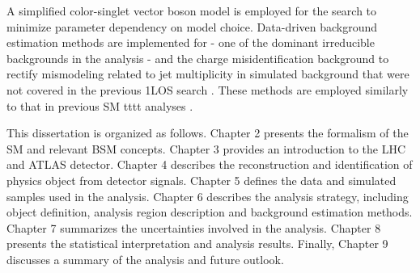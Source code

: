 \documentclass[../thesis.tex]{subfiles}
\begin{document}
A simplified color-singlet vector boson model \citep{theory:ttZp} is employed for the search to minimize parameter dependency on model choice.
Data-driven background estimation methods are implemented for \ttW - one of the dominant irreducible backgrounds in the analysis - and the charge misidentification background to rectify mismodeling related to jet multiplicity in simulated background that were not covered in the previous \acs{1LOS} search \citep{theory:ttZp_1los}. These methods are employed similarly to that in previous \acs{SM} \acs{tttt} analyses \citep{tttt_evidence,tttt_obs}.

This dissertation is organized as follows. Chapter 2 presents the formalism of the \acs{SM} and relevant \acs{BSM} concepts. Chapter 3 provides an introduction to the \acs{LHC} and \acs{ATLAS} detector. Chapter 4 describes the reconstruction and identification of physics object from detector signals. Chapter 5 defines the data and simulated samples used in the analysis. Chapter 6 describes the analysis strategy, including object definition, analysis region description and background estimation methods. Chapter 7 summarizes the uncertainties involved in the analysis. Chapter 8 presents the statistical interpretation and analysis results. Finally, Chapter 9 discusses a summary of the analysis and future outlook.
\end{document}
